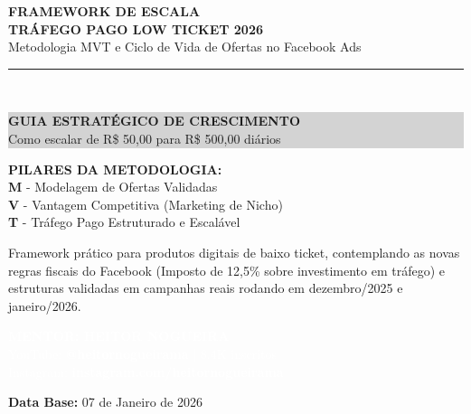 \documentclass[12pt, a4paper]{article}
\newcommand{\reais}[1]{R\$ #1}
\begin{document}
\begin{titlepage}
    \centering
    \vspace*{3cm}
    {\Huge \textbf{\textcolor{primaryColor}{FRAMEWORK DE ESCALA}}} \\
    \vspace{0.5cm}
    {\Large \textbf{TRÁFEGO PAGO LOW TICKET 2026}} \\
    \vspace{0.3cm}
    {\large Metodologia MVT e Ciclo de Vida de Ofertas no Facebook Ads} \\
    \vspace{2cm}
    \rule{10cm}{1.5pt} \\
    \vspace{0.5cm}
    \colorbox{lightGray}{%
        \parbox{0.9\textwidth}{%
            \centering
            \vspace{0.3cm}
            {\Large \textbf{GUIA ESTRATÉGICO DE CRESCIMENTO}} \\
            \vspace{0.3cm}
            {\large Como escalar de \reais{50,00} para \reais{500,00} diários} \\
            \vspace{0.3cm}
        }%
    }
    \vspace{2cm}

    \begin{flushleft}
    \textbf{PILARES DA METODOLOGIA:} \\
    \vspace{0.2cm}
    \textcolor{primaryColor}{\textbf{M}} - Modelagem de Ofertas Validadas \\
    \textcolor{primaryColor}{\textbf{V}} - Vantagem Competitiva (Marketing de Nicho) \\
    \textcolor{primaryColor}{\textbf{T}} - Tráfego Pago Estruturado e Escalável
    \end{flushleft}

    \vfill
    {\small Framework prático para produtos digitais de baixo ticket, contemplando as novas regras fiscais do Facebook (Imposto de 12,5\% sobre investimento em tráfego) e estruturas validadas em campanhas reais rodando em dezembro/2025 e janeiro/2026.} \\
    \vspace{1.5cm}

    \colorbox{accentColor}{%
        \parbox{0.9\textwidth}{%
            \centering
            \vspace{0.6cm}
            \textcolor{white}{\Large \textbf{MENTOR: HEITOR NOGUEIRA}} \\
            \vspace{0.2cm}
            \textcolor{white}{\normalsize YouTube: \textbf{@heitornogueirama} | 8.4K inscritos} \\
            \textcolor{white}{\normalsize Instagram: \textbf{instagram.com/heitornogueirama}} \\
            \vspace{0.6cm}
        }%
    }

    \vspace{0.2cm}
    \textbf{Data Base:} 07 de Janeiro de 2026
\end{titlepage}
\end{document}
